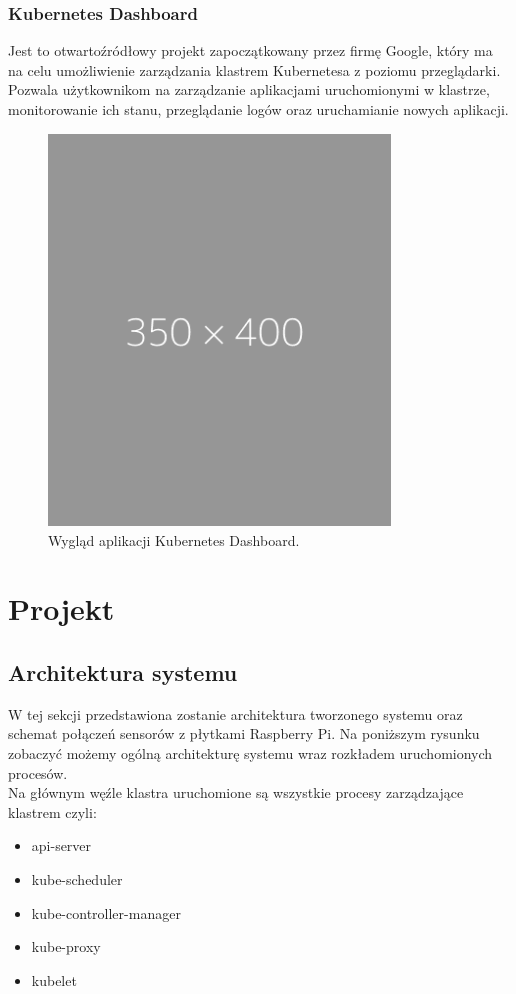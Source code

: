 \documentclass[12pt]{report}
\let\Oldsection\section
\renewcommand{\section}{\FloatBarrier\Oldsection}
\let\Oldsubsection\subsection
\renewcommand{\subsection}{\FloatBarrier\Oldsubsection}
\let\Oldsubsubsection\subsubsection
\renewcommand{\subsubsection}{\FloatBarrier\Oldsubsubsection}
\begin{document}
{\subsubsection{Kubernetes Dashboard}
Jest to otwartoźródłowy projekt zapoczątkowany przez firmę Google, który ma na celu umożliwienie zarządzania klastrem Kubernetesa z poziomu przeglądarki. Pozwala użytkownikom na zarządzanie aplikacjami uruchomionymi w klastrze, monitorowanie ich stanu, przeglądanie logów oraz uruchamianie nowych aplikacji.
\begin{figure}[h]
	\centering
	\includegraphics[width=0.81\textwidth]{images/placeholder.png}
	\caption{Wygląd aplikacji Kubernetes Dashboard.}
\end{figure}

\clearpage

\section{Projekt}
\subsection{Architektura systemu}
W tej sekcji przedstawiona zostanie architektura tworzonego systemu oraz schemat połączeń sensorów z płytkami Raspberry Pi. Na poniższym rysunku zobaczyć możemy ogólną architekturę systemu wraz rozkładem uruchomionych procesów. \\
Na głównym węźle klastra uruchomione są wszystkie procesy zarządzające klastrem czyli:
\begin{itemize}
\item{api-server}
\item{kube-scheduler}
\item{kube-controller-manager}
\item{kube-proxy}
\item{kubelet}
\end{itemize}

}
\end{document}
